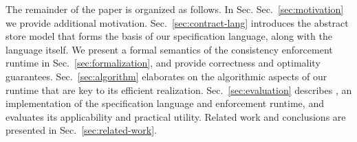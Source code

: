 The remainder of the paper is organized as follows.  In Sec.
Sec.~\ref{sec:motivation} we provide additional motivation.
Sec.~\ref{sec:contract-lang} introduces the abstract store model that
forms the basis of our specification language, along with the language
itself.  We present a formal semantics of the consistency enforcement
runtime in Sec.~\ref{sec:formalization}, and provide correctness and
optimality guarantees. Sec.~\ref{sec:algorithm} elaborates on the
algorithmic aspects of our runtime that are key to its efficient
realization.  Sec.~\ref{sec:evaluation} describes \tool, an
implementation of the specification language and enforcement runtime,
and evaluates its applicability and practical utility.  Related work
and conclusions are presented in Sec.~\ref{sec:related-work}.
